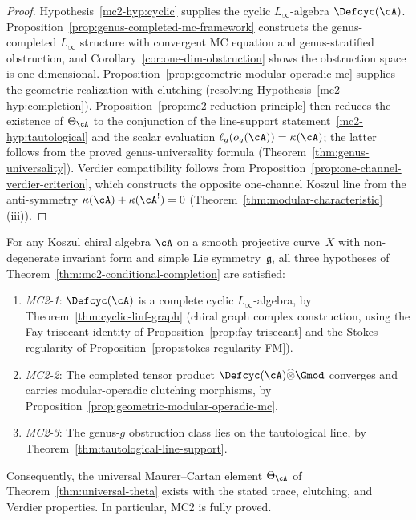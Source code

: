 \begin{proof}
Hypothesis~\ref{mc2-hyp:cyclic} supplies the cyclic
$L_\infty$-algebra $\Defcyc(\cA)$.
Proposition~\ref{prop:genus-completed-mc-framework} constructs the
genus-completed $L_\infty$ structure with convergent MC equation
and genus-stratified obstruction, and
Corollary~\ref{cor:one-dim-obstruction} shows the obstruction space
is one-dimensional.
Proposition~\ref{prop:geometric-modular-operadic-mc} supplies the
geometric realization with clutching
(resolving Hypothesis~\ref{mc2-hyp:completion}).
Proposition~\ref{prop:mc2-reduction-principle} then reduces the
existence of $\Theta_{\cA}$ to the conjunction of the line-support
statement~\ref{mc2-hyp:tautological} and the scalar evaluation
$\ell_g(o_g(\cA)) = \kappa(\cA)$; the latter follows from the
proved genus-universality formula
(Theorem~\ref{thm:genus-universality}).
Verdier compatibility follows from
Proposition~\ref{prop:one-channel-verdier-criterion}, which
constructs the opposite one-channel Koszul line from the
anti-symmetry $\kappa(\cA) + \kappa(\cA^!) = 0$
(Theorem~\ref{thm:modular-characteristic}(iii)).
\end{proof}

\begin{theorem}
\label{thm:mc2-full-resolution}
For any Koszul chiral algebra $\cA$ on a smooth projective
curve~$X$ with non-degenerate invariant form and simple Lie
symmetry~$\mathfrak{g}$, all three hypotheses of
Theorem~\textup{\ref{thm:mc2-conditional-completion}} are satisfied:
\begin{enumerate}[label=\textup{(\roman*)}]
\item \emph{MC2-1}: $\Defcyc(\cA)$ is a complete cyclic
  $L_\infty$-algebra, by
  Theorem~\textup{\ref{thm:cyclic-linf-graph}} \textup{(}chiral
  graph complex construction, using the Fay trisecant identity of
  Proposition~\textup{\ref{prop:fay-trisecant}} and the Stokes
  regularity of
  Proposition~\textup{\ref{prop:stokes-regularity-FM}}\textup{)}.
\item \emph{MC2-2}: The completed tensor product
  $\Defcyc(\cA) \widehat{\otimes} \Gmod$ converges and carries
  modular-operadic clutching morphisms, by
  Proposition~\textup{\ref{prop:geometric-modular-operadic-mc}}.
\item \emph{MC2-3}: The genus-$g$ obstruction class lies on the
  tautological line, by
  Theorem~\textup{\ref{thm:tautological-line-support}}.
\end{enumerate}
Consequently, the universal Maurer--Cartan element
$\Theta_{\cA}$ of
Theorem~\textup{\ref{thm:universal-theta}} exists with the
stated trace, clutching, and Verdier properties.
In particular, \textup{MC2} is fully proved.
\end{theorem}

